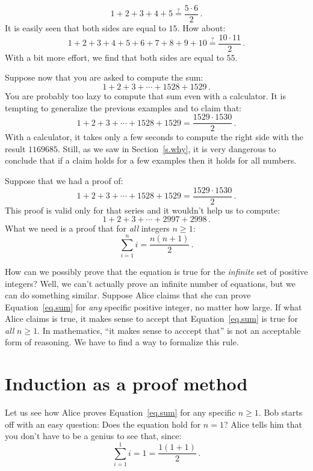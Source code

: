 \documentclass[11pt,a4paper]{report}
\newcommand*{\qeq}{\stackrel{?}{=}}
\begin{document}
\[
1+2+3+4+5\qeq{}\frac{5\cdot 6}{2}\,.
\]
It is easily seen that both sides are equal to $15$. How about:
\[
1+2+3+4+5+6+7+8+9+10\qeq{}\frac{10\cdot 11}{2}\,.
\]
With a bit more effort, we find that both sides are equal to $55$.

Suppose now that you are asked to compute the sum:
\[
1+2+3+\cdots+1528+1529\,.
\]
You are probably too lazy to compute that sum even with a calculator. It is tempting to generalize the previous examples and to claim that:
\[
1+2+3+\cdots+1528+1529=\frac{1529\cdot 1530}{2}\,.
\]
With a calculator, it takes only a few seconds to compute the right side with the result $1169685$. Still, as we saw in Section~\ref{s.why}, it is very dangerous to conclude that if a claim holds for a few examples then it holds for all numbers.

Suppose that we had a proof of:
\[
1+2+3+\cdots+1528+1529=\frac{1529\cdot 1530}{2}\,.
\]
This proof is valid only for that series and it wouldn't help us to compute:
\[
1+2+3+\cdots+2997+2998\,.
\]
What we need is a proof that for \emph{all} integers $n\geq 1$:
\begin{equation}
\sum_{i=1}^n i = \frac{n(n+1)}{2}\,.\label{eq.sum}
\end{equation}

How can we possibly prove that the equation is true for the \emph{infinite} set of positive integers? Well, we can't actually prove an infinite number of equations, but we can do something similar. Suppose Alice claims that she can prove Equation~\ref{eq.sum} for \emph{any} specific positive integer, no matter how large. If what Alice claims is true, it makes sense to accept that Equation~\ref{eq.sum} is true for \emph{all} $n\geq 1$. In mathematics, ``it makes sense to acccept that'' is not an acceptable form of reasoning. We have to find a way to formalize this rule.

\section{Induction as a proof method}\label{s.rule}

Let us see how Alice proves Equation~\ref{eq.sum} for any specific $n\geq 1$. Bob starts off with an easy question: Does the equation hold for $n=1$? Alice tells him that you don't have to be a genius to see that, since:
\begin{equation}\label{eq.one}
\sum_{i=1}^1 i = 1 = \frac{1(1+1)}{2}\,.
\end{equation}
\end{document}
